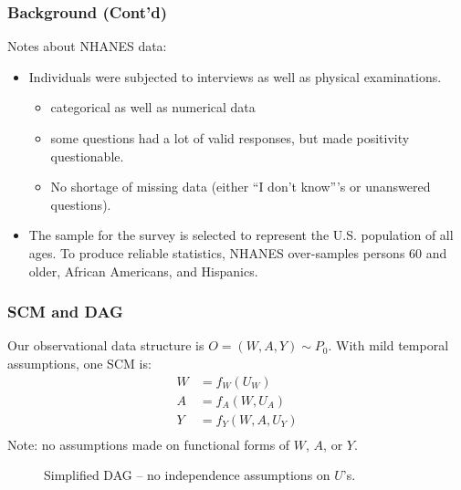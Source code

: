 \documentclass{beamer}
\begin{document}
\begin{frame}
  \frametitle{Background (Cont'd)}
  Notes about NHANES data:
  \begin{itemize}
 \item Individuals were subjected to interviews as well as physical examinations.
  \begin{itemize}
    \item categorical as well as numerical data
    \item some questions had a lot of valid responses, but made positivity questionable.
    \item No shortage of missing data (either ``I don't know'''s or unanswered questions).
  \end{itemize}
 \item The sample for the survey is selected to represent the U.S. population of all ages. To produce reliable statistics, NHANES over-samples persons 60 and older, African Americans, and Hispanics.
 \end{itemize}
\end{frame}

\begin{frame}
\frametitle{SCM and DAG}
\begin{center}
\begin{minipage}{0.55\linewidth}
Our observational data structure is $O=(W,A,Y)\sim P_0$. With mild temporal assumptions, one SCM is:
\begin{align*}
W &= f_{W}(U_{W}) \\
A &= f_{A}(W,U_{A}) \\
Y &= f_{Y}(W,A,U_{Y}) \\
\end{align*}
Note: no assumptions made on functional forms of $W$, $A$, or $Y$.
\end{minipage}
\begin{minipage}{0.4\linewidth}
  \begin{figure}[h]
    \centering
  \caption{Simplified DAG -- no independence assumptions on $U$'s.}
  \label{fig:DAG}
  \end{figure}
\end{minipage}
\end{center}
\end{frame}
\end{document}
